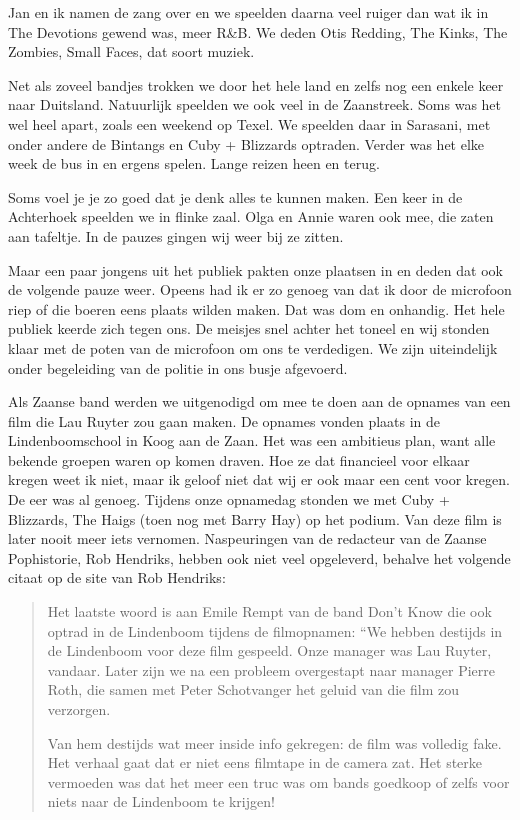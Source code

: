 \documentclass[12pt,twoside]{memoir}
\begin{document}
Jan en ik namen de zang over en we speelden daarna veel ruiger dan wat ik in The Devotions gewend was, meer R&B. We deden Otis Redding, The Kinks, The Zombies, Small Faces, dat soort muziek.

Net als zoveel bandjes trokken we door het hele land en zelfs nog een enkele keer naar Duitsland. Natuurlijk speelden we ook veel in de Zaanstreek. Soms was het wel heel apart, zoals een weekend op Texel. We speelden daar in Sarasani, met onder andere de Bintangs en Cuby + Blizzards optraden. Verder was het elke week de bus in en ergens spelen. Lange reizen heen en terug.

Soms voel je je zo goed dat je denk alles te kunnen maken. Een keer in de Achterhoek speelden we in flinke zaal. Olga en Annie waren ook mee, die zaten aan tafeltje. In de pauzes gingen wij weer bij ze zitten. 

Maar een paar jongens uit het publiek pakten onze plaatsen in en deden dat ook de volgende pauze weer. Opeens had ik er zo genoeg van dat ik door de microfoon riep of die boeren eens plaats wilden maken. Dat was dom en onhandig. Het hele publiek keerde zich tegen ons. De meisjes snel achter het toneel en wij stonden klaar met de poten van de microfoon om ons te verdedigen. We zijn uiteindelijk onder begeleiding van de politie in ons busje afgevoerd.

Als Zaanse band werden we uitgenodigd om mee te doen aan de opnames van een film die Lau Ruyter zou gaan maken. De opnames vonden plaats in de Lindenboomschool in Koog aan de Zaan. Het was een ambitieus plan, want alle bekende groepen waren op komen draven. Hoe ze dat financieel voor elkaar kregen weet ik niet, maar ik geloof niet dat wij er ook maar een cent voor kregen. De eer was al genoeg. Tijdens onze opnamedag stonden we met Cuby + Blizzards, The Haigs (toen nog met Barry Hay) op het podium. Van deze film is later nooit meer iets vernomen. Naspeuringen van de redacteur van de Zaanse Pophistorie, Rob Hendriks, hebben ook niet veel opgeleverd, behalve het volgende citaat op de site van Rob Hendriks: 

\begin{quote}
Het laatste woord is aan Emile Rempt van de band Don’t Know die ook optrad in de Lindenboom tijdens de filmopnamen: “We hebben destijds in de Lindenboom voor deze film gespeeld. Onze manager was Lau Ruyter, vandaar. Later zijn we na een probleem overgestapt naar manager Pierre Roth, die samen met Peter Schotvanger het geluid van die film zou verzorgen.

Van hem destijds wat meer inside info gekregen: de film was volledig fake. Het verhaal gaat dat er niet eens filmtape in de camera zat. Het sterke vermoeden was dat het meer een truc was om bands goedkoop of zelfs voor niets naar de Lindenboom te krijgen!
\end{quote}
\end{document}
